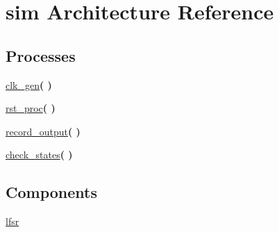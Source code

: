 \hypertarget{classlfsr__tb_1_1sim}{\section{sim Architecture Reference}
\label{classlfsr__tb_1_1sim}
}
\subsection*{Processes}
 \begin{DoxyCompactItemize}
\item 
\hypertarget{classlfsr__tb_1_1sim_a47d2864b6dd82daccd7b71fcfd9a682c}{\hyperlink{classlfsr__tb_1_1sim_a47d2864b6dd82daccd7b71fcfd9a682c}{clk\-\_\-gen}{\bfseries  (  )}}\label{classlfsr__tb_1_1sim_a47d2864b6dd82daccd7b71fcfd9a682c}

\item 
\hypertarget{classlfsr__tb_1_1sim_ac384adbd9df3496973e9349fd5ca6900}{\hyperlink{classlfsr__tb_1_1sim_ac384adbd9df3496973e9349fd5ca6900}{rst\-\_\-proc}{\bfseries  (  )}}\label{classlfsr__tb_1_1sim_ac384adbd9df3496973e9349fd5ca6900}

\item 
\hypertarget{classlfsr__tb_1_1sim_a6523adb14d9acd35e5ec8df5867a6a36}{\hyperlink{classlfsr__tb_1_1sim_a6523adb14d9acd35e5ec8df5867a6a36}{record\-\_\-output}{\bfseries  (  )}}\label{classlfsr__tb_1_1sim_a6523adb14d9acd35e5ec8df5867a6a36}

\item 
\hypertarget{classlfsr__tb_1_1sim_a35ccef32cc961f4b28be03e498532eb3}{\hyperlink{classlfsr__tb_1_1sim_a35ccef32cc961f4b28be03e498532eb3}{check\-\_\-states}{\bfseries  (  )}}\label{classlfsr__tb_1_1sim_a35ccef32cc961f4b28be03e498532eb3}

\end{DoxyCompactItemize}
\subsection*{Components}
 \begin{DoxyCompactItemize}
\item 
\hypertarget{classlfsr__tb_1_1sim_aabe8f8d9ad34874edd366edaf2e00cc0}{\hyperlink{classlfsr__tb_1_1sim_aabe8f8d9ad34874edd366edaf2e00cc0}{lfsr}  {\bfseries }  }\label{classlfsr__tb_1_1sim_aabe8f8d9ad34874edd366edaf2e00cc0}

\end{DoxyCompactItemize}
